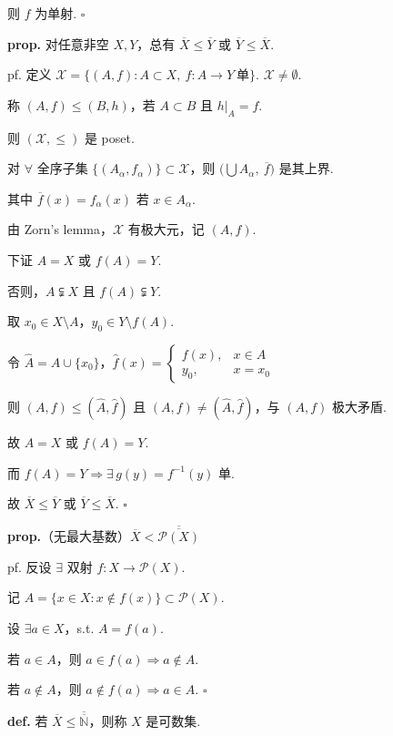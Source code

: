 \documentclass[11pt]{ctexart}
\theoremstyle{definition}
\begin{document}
则 $f$ 为单射. $\square$

\textbf{prop.} 对任意非空 $X, Y$，总有 $\overline{X} \leq \overline{Y}$ 或 $\overline{Y} \leq \overline{X}$.

pf. 定义 $\mathscr{X} = \{(A, f) : A \subset X,\ f: A \to Y\ \text{单}\}$. $\mathscr{X} \neq \emptyset$.

称 $(A, f) \leq (B, h)$，若 $A \subset B$ 且 $h\vert_A = f$.

则 $(\mathscr{X}, \leq)$ 是 poset.

对 $\forall$ 全序子集 $\{(A_\alpha, f_\alpha)\} \subset \mathscr{X}$，则 $\big(\bigcup A_\alpha,\ \overline{f}\big)$ 是其上界.

其中 $\overline{f}(x) = f_\alpha(x)$ 若 $x \in A_\alpha$.

由 Zorn's lemma，$\mathscr{X}$ 有极大元，记 $(A, f)$.

下证 $A = X$ 或 $f(A) = Y$.

否则，$A \subsetneqq X$ 且 $f(A) \subsetneqq Y$.

取 $x_0 \in X \setminus A$，$y_0 \in Y \setminus f(A)$.

令 $\widehat{A} = A \cup \{x_0\}$，$\widehat{f}(x) = \begin{cases} f(x), & x \in A \\ y_0, & x = x_0 \end{cases}$

则 $(A, f) \leq (\widehat{A}, \widehat{f})$ 且 $(A, f) \neq (\widehat{A}, \widehat{f})$，与 $(A, f)$ 极大矛盾.

故 $A = X$ 或 $f(A) = Y$.

而 $f(A) = Y \Rightarrow \exists\, g(y) = f^{-1}(y)$ 单.

故 $\overline{X} \leq \overline{Y}$ 或 $\overline{Y} \leq \overline{X}$. $\square$

\textbf{prop.}（无最大基数）$\overline{X} < \overline{\overline{\mathcal{P}(X)}}$

pf. 反设 $\exists$ 双射 $f: X \to \mathcal{P}(X)$.

记 $A = \{x \in X : x \notin f(x)\} \subset \mathcal{P}(X)$.

设 $\exists a \in X$，s.t. $A = f(a)$.

若 $a \in A$，则 $a \in f(a) \Rightarrow a \notin A$.

若 $a \notin A$，则 $a \notin f(a) \Rightarrow a \in A$. $\square$

\textbf{def.} 若 $\overline{X} \leq \overline{\overline{\mathbb{N}}}$，则称 $X$ 是可数集.
\end{document}
